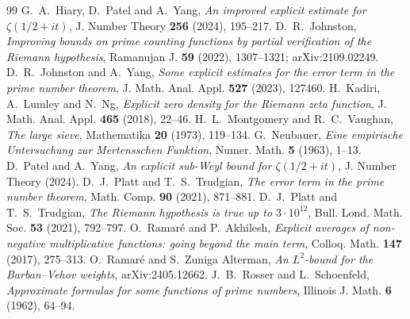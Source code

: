 \documentclass[11pt]{amsart}
\numberwithin{equation}{section}
\theoremstyle{definition}
\theoremstyle{remark}
\begin{document}
\begin{thebibliography}{99}
 G.~A.~Hiary, D.~Patel and A.~Yang, \emph{An improved explicit estimate for $\zeta(1/2+it)$}, J. Number Theory \textbf{256} (2024), 195--217.
 D.~R.~Johnston, \emph{Improving bounds on prime counting functions by partial verification of the Riemann hypothesis}, Ramanujan J. \textbf{59} (2022), 1307--1321; arXiv:2109.02249.
 D.~R.~Johnston and A.~Yang, \emph{Some explicit estimates for the error term in the prime number theorem}, J. Math. Anal. Appl. \textbf{527} (2023), 127460.
 H.~Kadiri, A.~Lumley and N.~Ng, \emph{Explicit zero density for the Riemann zeta function}, J. Math. Anal. Appl. \textbf{465} (2018), 22--46.
 H.~L.~Montgomery and R.~C.~Vaughan, \emph{The large sieve}, Mathematika \textbf{20} (1973), 119--134.
 G.~Neubauer, \emph{Eine empirische Untersuchung zur Mertensschen Funktion}, Numer. Math. \textbf{5} (1963), 1--13.
 D.~Patel and A.~Yang, \emph{An explicit sub-Weyl bound for $\zeta(1/2+it)$}, J. Number Theory (2024).
 D.~J.~Platt and T.~S.~Trudgian, \emph{The error term in the prime number theorem}, Math. Comp. \textbf{90} (2021), 871--881.
 D.~J.~Platt and T.~S.~Trudgian, \emph{The Riemann hypothesis is true up to $3\cdot10^{12}$}, Bull. Lond. Math. Soc. \textbf{53} (2021), 792--797.
 O.~Ramar\'e and P.~Akhilesh, \emph{Explicit averages of non-negative multiplicative functions: going beyond the main term}, Colloq. Math. \textbf{147} (2017), 275--313.
 O.~Ramar\'e and S.~Zuniga Alterman, \emph{An $L^2$-bound for the Barban--Vehov weights}, arXiv:2405.12662.
 J.~B.~Rosser and L.~Schoenfeld, \emph{Approximate formulas for some functions of prime numbers}, Illinois J. Math. \textbf{6} (1962), 64--94.
\end{thebibliography}
\end{document}
